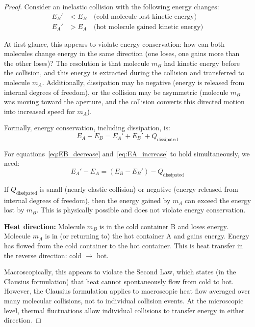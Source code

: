 \documentclass[12pt,a4paper]{article}
\theoremstyle{definition}
\theoremstyle{remark}
\begin{document}
\begin{proof}
Consider an inelastic collision with the following energy changes:
\begin{align}
E_B' &< E_B \quad \text{(cold molecule lost kinetic energy)} \label{eq:EB_decrease} \\
E_A' &> E_A \quad \text{(hot molecule gained kinetic energy)} \label{eq:EA_increase}
\end{align}

At first glance, this appears to violate energy conservation: how can both molecules change energy in the same direction (one loses, one gains more than the other loses)? The resolution is that molecule $m_B$ had kinetic energy before the collision, and this energy is extracted during the collision and transferred to molecule $m_A$. Additionally, dissipation may be negative (energy is released from internal degrees of freedom), or the collision may be asymmetric (molecule $m_B$ was moving toward the aperture, and the collision converts this directed motion into increased speed for $m_A$).

Formally, energy conservation, including dissipation, is:
\begin{equation}
E_A + E_B = E_A' + E_B' + Q_{\text{dissipated}}
\end{equation}

For equations~\eqref{eq:EB_decrease} and~\eqref{eq:EA_increase} to hold simultaneously, we need:
\begin{equation}
E_A' - E_A = (E_B - E_B') - Q_{\text{dissipated}}
\end{equation}

If $Q_{\text{dissipated}}$ is small (nearly elastic collision) or negative (energy released from internal degrees of freedom), then the energy gained by $m_A$ can exceed the energy lost by $m_B$. This is physically possible and does not violate energy conservation.

\textbf{Heat direction:}
Molecule $m_B$ is in the cold container B and loses energy. Molecule $m_A$ is in (or returning to) the hot container A and gains energy. Energy has flowed from the cold container to the hot container. This is heat transfer in the reverse direction: cold $\to$ hot.

Macroscopically, this appears to violate the Second Law, which states (in the Clausius formulation) that heat cannot spontaneously flow from cold to hot. However, the Clausius formulation applies to macroscopic heat flow averaged over many molecular collisions, not to individual collision events. At the microscopic level, thermal fluctuations allow individual collisions to transfer energy in either direction.


\end{proof}
\end{document}
